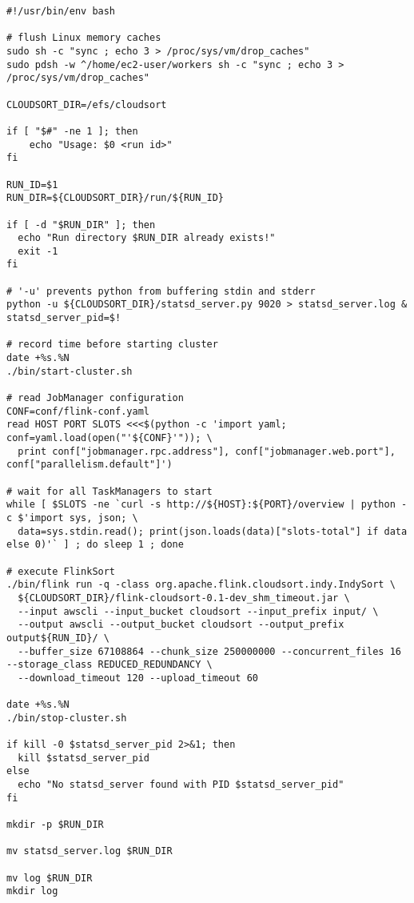 \documentclass{article}
\begin{document}
\begin{adjustwidth}{-1.5in}{-1.5in}
\begin{verbatim}
#!/usr/bin/env bash

# flush Linux memory caches
sudo sh -c "sync ; echo 3 > /proc/sys/vm/drop_caches"
sudo pdsh -w ^/home/ec2-user/workers sh -c "sync ; echo 3 > /proc/sys/vm/drop_caches"

CLOUDSORT_DIR=/efs/cloudsort

if [ "$#" -ne 1 ]; then
    echo "Usage: $0 <run id>"
fi

RUN_ID=$1
RUN_DIR=${CLOUDSORT_DIR}/run/${RUN_ID}

if [ -d "$RUN_DIR" ]; then
  echo "Run directory $RUN_DIR already exists!"
  exit -1
fi

# '-u' prevents python from buffering stdin and stderr
python -u ${CLOUDSORT_DIR}/statsd_server.py 9020 > statsd_server.log &
statsd_server_pid=$!

# record time before starting cluster
date +%s.%N
./bin/start-cluster.sh

# read JobManager configuration
CONF=conf/flink-conf.yaml
read HOST PORT SLOTS <<<$(python -c 'import yaml; conf=yaml.load(open("'${CONF}'")); \
  print conf["jobmanager.rpc.address"], conf["jobmanager.web.port"], conf["parallelism.default"]')

# wait for all TaskManagers to start
while [ $SLOTS -ne `curl -s http://${HOST}:${PORT}/overview | python -c $'import sys, json; \
  data=sys.stdin.read(); print(json.loads(data)["slots-total"] if data else 0)'` ] ; do sleep 1 ; done

# execute FlinkSort
./bin/flink run -q -class org.apache.flink.cloudsort.indy.IndySort \
  ${CLOUDSORT_DIR}/flink-cloudsort-0.1-dev_shm_timeout.jar \
  --input awscli --input_bucket cloudsort --input_prefix input/ \
  --output awscli --output_bucket cloudsort --output_prefix output${RUN_ID}/ \
  --buffer_size 67108864 --chunk_size 250000000 --concurrent_files 16 --storage_class REDUCED_REDUNDANCY \
  --download_timeout 120 --upload_timeout 60

date +%s.%N
./bin/stop-cluster.sh

if kill -0 $statsd_server_pid 2>&1; then
  kill $statsd_server_pid
else
  echo "No statsd_server found with PID $statsd_server_pid"
fi

mkdir -p $RUN_DIR

mv statsd_server.log $RUN_DIR

mv log $RUN_DIR
mkdir log
\end{verbatim}
\end{adjustwidth}
\end{document}
